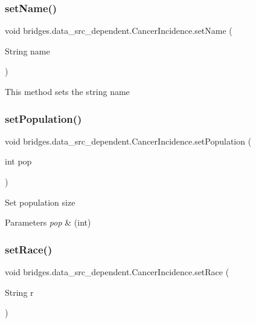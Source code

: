 \subsubsection{\texorpdfstring{setName()}{setName()}}
{\footnotesize\ttfamily void bridges.\+data\+\_\+src\+\_\+dependent.\+Cancer\+Incidence.\+set\+Name (\begin{DoxyParamCaption}\item[{String}]{name }\end{DoxyParamCaption})}

This method sets the string name \mbox{\label{classbridges_1_1data__src__dependent_1_1_cancer_incidence_a9f1caf002b6573aa699a81ed1b835af0}} 
\subsubsection{\texorpdfstring{setPopulation()}{setPopulation()}}
{\footnotesize\ttfamily void bridges.\+data\+\_\+src\+\_\+dependent.\+Cancer\+Incidence.\+set\+Population (\begin{DoxyParamCaption}\item[{int}]{pop }\end{DoxyParamCaption})}

Set population size


\begin{DoxyParams}{Parameters}
{\em pop} & (int) \\
\hline
\end{DoxyParams}
\mbox{\label{classbridges_1_1data__src__dependent_1_1_cancer_incidence_a8c26c4358561453f3d2ca3a463eed872}} 
\subsubsection{\texorpdfstring{setRace()}{setRace()}}
{\footnotesize\ttfamily void bridges.\+data\+\_\+src\+\_\+dependent.\+Cancer\+Incidence.\+set\+Race (\begin{DoxyParamCaption}\item[{String}]{r }\end{DoxyParamCaption})}

